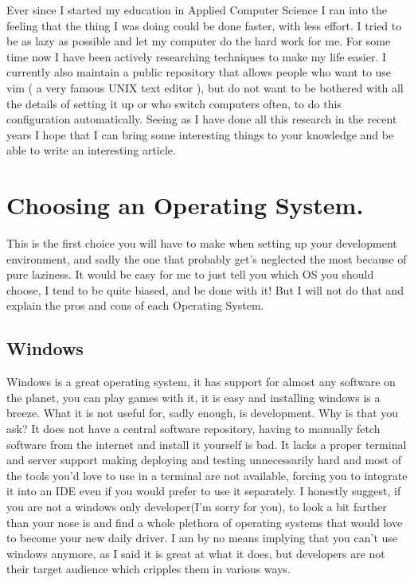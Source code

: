 \documentclass[paper=a4, fontsize=10pt]{scrartcl} %
\numberwithin{equation}{section} %
\numberwithin{figure}{section} %
\numberwithin{table}{section} %
\begin{document}
Ever since I started my education in Applied Computer Science I ran into the
feeling that the thing I was doing could be done faster, with less effort. I
tried to be as lazy as possible and let my computer do the hard work for me.
For some time now I have been actively researching techniques to make my life
easier. I currently also maintain a public repository that allows people who
want to use vim ( a very famous UNIX text editor ), but do not want to be bothered with all the details of setting
it up or who switch computers often, to do this configuration
automatically. Seeing as I have done all this research in the recent years I
hope that I can bring some interesting things to your knowledge and be able to
write an interesting article.


\section{Choosing an Operating System.}
This is the first choice you will have to make when setting up your development
environment, and sadly the one that probably get's neglected the most because of
pure laziness. It would be easy for me to just tell you which OS you should
choose, I tend to be quite biased, and be done with it! But I will not do that and explain the pros and
cons of each Operating System.

\subsection{Windows}
Windows is a great operating system, it has support for almost any software on
the planet, you can play games with it, it is easy and installing windows is a
breeze. What it is not useful for, sadly enough, is development. Why is that you
ask? It does not have a central software repository, having to manually fetch
software from the internet and install it yourself is bad. It lacks a proper terminal and server support
making deploying and testing unnecessarily hard and most of the tools you'd
love to use in a terminal are not available, forcing you to integrate it into
an IDE even if you would prefer to use it separately. I honestly suggest, if you
are not a windows only developer(I'm sorry for you), to look a bit farther than
your nose is and find a whole plethora of operating systems that would love to
become your new daily driver. I am by no means implying that you can't use
windows anymore, as I said it is great at what it does, but  developers are not
their target audience which cripples them in various ways.
\end{document}
